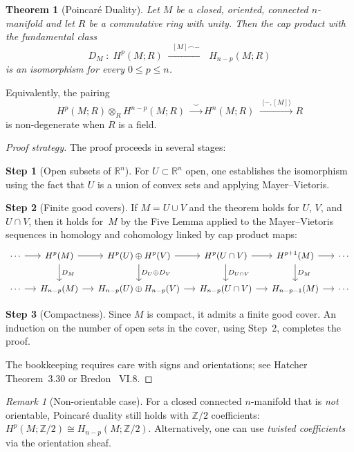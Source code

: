 \documentclass[12pt,a4paper,openany]{book}
\theoremstyle{definition}
\theoremstyle{plain}
\newtheorem{theorem}[definition]{Theorem}
\theoremstyle{remark}
\newtheorem{remark}[definition]{Remark}
\newcommand{\Z}{\mathbb{Z}}
\newcommand{\R}{\mathbb{R}}
\begin{document}
\begin{theorem}[Poincar\'e Duality]\label{thm:poincare-duality}
Let $M$ be a closed, oriented, connected $n$-manifold and let $R$ be a
commutative ring with unity.  Then the cap product with the fundamental
class
\[
  D_M\;:\; H^p(M;R) \;\xrightarrow{\;\;[M]\frown -\;\;}
  \; H_{n-p}(M;R)
\]
is an isomorphism for every $0\le p\le n$.
\end{theorem}

Equivalently, the pairing
\[
  H^p(M;R)\otimes_R H^{n-p}(M;R) \;\xrightarrow{\;\smile\;}
  H^n(M;R) \;\xrightarrow{\;\langle -,[M]\rangle\;}
  R
\]
is non-degenerate when $R$ is a field.

\begin{proof}[Proof strategy]
The proof proceeds in several stages:

\smallskip\noindent
\textbf{Step 1} (Open subsets of $\R^n$).  For $U\subset\R^n$ open,
one establishes the isomorphism using the fact that $U$ is a union of
convex sets and applying Mayer--Vietoris.

\smallskip\noindent
\textbf{Step 2} (Finite good covers).  If $M = U\cup V$ and the
theorem holds for $U$, $V$, and $U\cap V$, then it holds for~$M$ by
the Five Lemma applied to the Mayer--Vietoris
sequences in homology and cohomology linked by cap product maps:
\[
\begin{tikzcd}[column sep=small, font=\small]
  \cdots \ar[r]
  & H^p(M) \ar[r]\ar[d,"D_M"]
  & H^p(U)\oplus H^p(V) \ar[r]\ar[d,"D_U\oplus D_V"]
  & H^p(U\cap V) \ar[r]\ar[d,"D_{U\cap V}"]
  & H^{p+1}(M) \ar[r]\ar[d,"D_M"]
  & \cdots \\
  \cdots \ar[r]
  & H_{n-p}(M) \ar[r]
  & H_{n-p}(U)\oplus H_{n-p}(V) \ar[r]
  & H_{n-p}(U\cap V) \ar[r]
  & H_{n-p-1}(M) \ar[r]
  & \cdots
\end{tikzcd}
\]

\smallskip\noindent
\textbf{Step 3} (Compactness).  Since $M$ is compact, it admits a
finite good cover.  An induction on the number of
open sets in the cover, using Step~2, completes the proof.

The bookkeeping requires care with signs and orientations; see
Hatcher~\cite{hatcher} Theorem~3.30 or Bredon~\cite{bredon} VI.8.
\end{proof}

\begin{remark}[Non-orientable case]
For a closed connected $n$-manifold that is \emph{not} orientable,
Poincar\'e duality still holds with $\Z/2$ coefficients:
$H^p(M;\Z/2)\cong H_{n-p}(M;\Z/2)$.  Alternatively, one can use
\emph{twisted coefficients} via the
orientation sheaf.
\end{remark}
\end{document}
